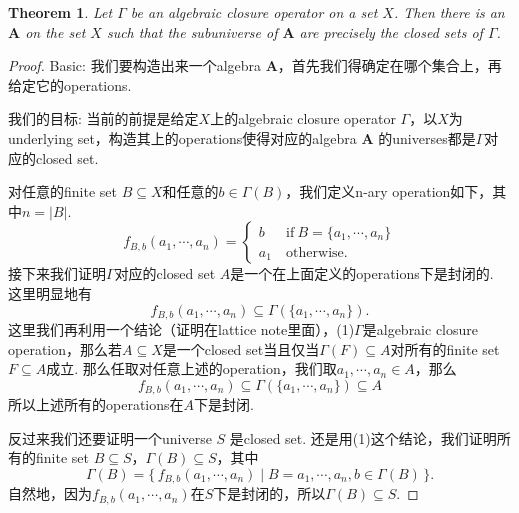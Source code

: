 \documentclass{article}
\newtheorem{theorem}{Theorem}[section]
\newcommand\Set[2]{\{\,#1\mid#2\,\}} %
\newcommand\algebra{\mathbf{A}}
\begin{document}
\begin{theorem}
\rm Let $\Gamma$ be an algebraic closure operator on a set $X$. Then there is an $\algebra$ on the set $X$ such that the subuniverse of $\algebra$ are precisely the closed sets of $\Gamma$.
\end{theorem}

\begin{proof}
Basic: 我们要构造出来一个algebra $\algebra$，首先我们得确定在哪个集合上，再给定它的operations. 

我们的目标: 当前的前提是给定$X$上的algebraic closure operator $\Gamma$，以$X$为underlying set，构造其上的operations使得对应的algebra $\algebra$ 的universes都是$\Gamma$对应的closed set.

对任意的finite set $B \subseteq X$和任意的$b \in \Gamma(B)$，我们定义n-ary operation如下，其中$n = |B|$.
$$
f_{B,b}(a_1,\cdots,a_n) = \left\{
\begin{array}{ll} 
b \ & \text{if}\ B=\{a_1,\cdots,a_n\} \\ 
a_1\ & \text{otherwise}.  
\end{array}
\right.   
$$
接下来我们证明$\Gamma$对应的closed set $A$是一个在上面定义的operations下是封闭的. 这里明显地有
$$
f_{B,b}(a_1,\cdots,a_n) \subseteq \Gamma(\{a_1,\cdots,a_n\}).
$$
这里我们再利用一个结论（证明在lattice note里面），(1)$\Gamma$是algebraic closure operation，那么若$A \subseteq X$是一个closed set当且仅当$\Gamma(F) \subseteq A$对所有的finite set $F \subseteq A$成立. 那么任取对任意上述的operation，我们取$a_1,\cdots,a_n \in A$，那么
$$
f_{B,b}(a_1,\cdots,a_n) \subseteq \Gamma(\{a_1,\cdots,a_n\}) \subseteq A
$$
所以上述所有的operations在$A$下是封闭.

反过来我们还要证明一个universe $S$ 是closed set. 还是用(1)这个结论，我们证明所有的finite set $B \subseteq S$，$\Gamma(B) \subseteq S$，其中
$$
\Gamma(B) = \Set{f_{B,b}(a_1,\cdots,a_n)}{B={a_1,\cdots,a_n},b \in \Gamma(B)}.
$$
自然地，因为$f_{B,b}(a_1,\cdots,a_n)$在$S$下是封闭的，所以$\Gamma(B) \subseteq S$.
\end{proof}
\end{document}
